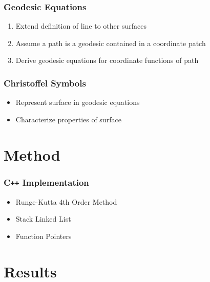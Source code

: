 \documentclass{beamer}
\begin{document}

\begin{frame}
	
	\frametitle{Geodesic Equations}
	
	\begin{enumerate}
		\item Extend definition of line to other surfaces
		\item Assume a path is a geodesic contained in a coordinate patch
		\item Derive geodesic equations for coordinate functions of path
	\end{enumerate}

\end{frame}


\begin{frame}
	
	\frametitle{Christoffel Symbols}
	
	\begin{itemize}
		\item Represent surface in geodesic equations
		\item Characterize properties of surface
	\end{itemize}
	
\end{frame}

\section{Method}

\begin{frame}
	
	\frametitle{C\texttt{++} Implementation}
	
	\begin{itemize}
		\item Runge-Kutta 4th Order Method
		\item Stack Linked List
		\item Function Pointers
	\end{itemize}
	
\end{frame}

\section{Results}
\end{document}
